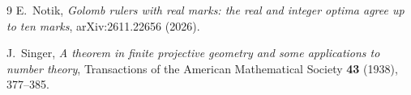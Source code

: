\documentclass[11pt]{article}
\begin{document}
\begin{thebibliography}{9}
E.~Notik,
\emph{Golomb rulers with real marks: the real and integer optima agree up to ten marks},
arXiv:2611.22656 (2026).

J.~Singer,
\emph{A theorem in finite projective geometry and some applications to number theory},
Transactions of the American Mathematical Society \textbf{43} (1938), 377--385.
\end{thebibliography}
\end{document}
